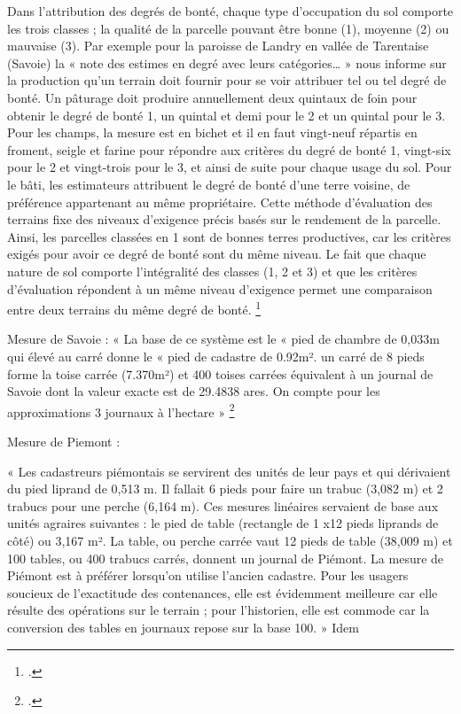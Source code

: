 Dans l’attribution des degrés de bonté, chaque type d’occupation du sol comporte les trois classes ; la qualité de la parcelle pouvant être bonne (1), moyenne (2) ou mauvaise (3). Par exemple pour la paroisse de Landry en vallée de Tarentaise (Savoie) la « note des estimes en degré avec leurs catégories… » nous informe sur la production qu’un terrain doit fournir pour se voir attribuer tel ou tel degré de bonté. Un pâturage doit produire annuellement deux quintaux de foin pour obtenir le degré de bonté 1, un quintal et demi pour le 2 et un quintal pour le 3. Pour les champs, la mesure est en bichet et il en faut vingt-neuf répartis en froment, seigle et farine pour répondre aux critères du degré de bonté 1, vingt-six pour le 2 et vingt-trois pour le 3, et ainsi de suite pour chaque usage du sol. Pour le bâti, les estimateurs attribuent le degré de bonté d’une terre voisine, de préférence appartenant au même propriétaire. Cette méthode d’évaluation des terrains fixe des niveaux d’exigence précis basés sur le rendement de la parcelle. Ainsi, les parcelles classées en 1 sont de bonnes terres productives, car les critères exigés pour avoir ce degré de bonté sont du même niveau. Le fait que chaque nature de sol comporte l’intégralité des classes (1, 2 et 3) et que les critères d’évaluation répondent à un même niveau d’exigence permet une comparaison entre deux terrains du même degré de bonté. \footcite{Baud2010} 


Mesure de Savoie :
« La base de ce système est le « pied de chambre de 0,033m qui élevé au carré donne le « pied de cadastre de 0.92m². un carré de 8 pieds forme la toise carrée (7.370m²) et 400 toises carrées équivalent à un journal de Savoie dont la valeur exacte est de 29.4838 ares. On compte pour les approximations 3 journaux à l’hectare » 	\footcite{GUICHONNET1955}


Mesure de Piemont :

« Les cadastreurs piémontais se servirent des unités de leur pays et qui dérivaient du pied liprand de 0,513 m. Il fallait 6 pieds pour faire un trabuc (3,082 m) et 2 trabucs pour une perche (6,164 m). Ces mesures linéaires servaient de base aux unités agraires suivantes : le pied de table (rectangle de 1 x12 pieds liprands de côté) ou 3,167 m². La table, ou perche carrée vaut 12 pieds de table (38,009 m) et 100 tables, ou 400 trabucs carrés, donnent un journal de Piémont. La mesure de Piémont est à préférer lorsqu’on utilise l’ancien cadastre. Pour les usagers soucieux de l’exactitude des contenances, elle est évidemment meilleure car elle résulte des opérations sur le terrain ; pour l’historien, elle est commode car la conversion des tables en journaux repose sur la base 100. » Idem


